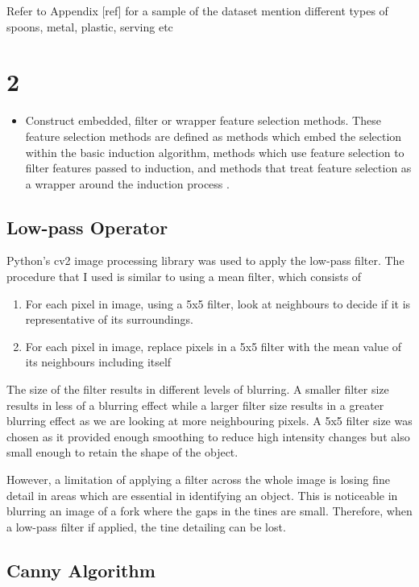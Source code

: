 Refer to Appendix [ref] for a sample of the dataset 
mention different types of spoons, metal, plastic, serving etc


\section{2}
\begin{itemize}
	\item Construct embedded, filter or wrapper feature selection methods. These feature selection methods are defined as methods which embed the selection within the basic induction algorithm, methods which use feature selection to filter features passed to induction, and methods that treat feature selection as a wrapper around the induction process \cite{blum1997selection}.
\end{itemize}


\subsection{Low-pass Operator}

Python's cv2 image processing library was used to apply the low-pass filter. The procedure that I used is similar to using a mean filter, which consists of
\begin{enumerate}
\item For each pixel in image, using a 5x5 filter, look at neighbours to decide if it is representative of its surroundings.
\item For each pixel in image, replace pixels in a 5x5 filter with the mean value of its neighbours including itself
\end{enumerate}
The size of the filter results in different levels of blurring. A smaller filter size results in less of a blurring effect while a larger filter size results in a greater blurring effect as we are looking at more neighbouring pixels. A 5x5 filter size was chosen as it provided enough smoothing to reduce high intensity changes but also small enough to retain the shape of the object.

However, a limitation of applying a filter across the whole image is losing fine detail in areas which are essential in identifying an object. This is noticeable in blurring an image of a fork where the gaps in the tines are small. Therefore, when a low-pass filter if applied, the tine detailing can be lost.

\subsection{Canny Algorithm}

